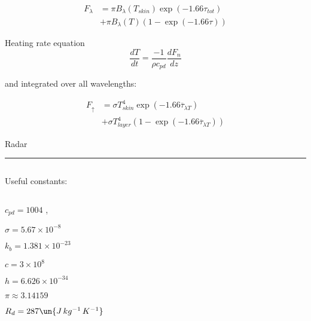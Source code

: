 \documentclass[12pt]{article}
\begin{document}
\begin{multicols}{2}
\begin{align}
  F_\lambda &= \pi B_\lambda(T_{skin}) \exp(-1.66 \tau_{tot}) \nonumber \\
  & +   \pi B_\lambda(T)(1 - \exp(-1.66 \tau))
\end{align}


\noindent
Heating rate equation
\begin{equation}
  \label{eq:fluxdiv}
  \frac{dT}{dt} = \frac{-1}{\rho c_{pd}} \frac{dF_n}{dz}
\end{equation}

\noindent
and integrated over all wavelengths:

     \begin{align}
       \label{eq:constantT}
       F_{\uparrow} &= \sigma T_{skin}^4 \exp( -1.66 \overline{\tau}_{\lambda T}  ) \nonumber \\
       & + \sigma T_{layer}^4(1- \exp( -1.66 \overline{\tau}_{\lambda T} ))
     \end{align}

\noindent
Radar


\rule{3cm}{.1mm}



$~$

\noindent
Useful constants:

$~$

$c_{pd}=1004$ , 

$\sigma=5.67 \times  10^{-8}$ 

$k_b = 1.381  \times 10^{-23}$  

$c=3 \times 10^{8}$ 

$h=6.626 \times 10^{-34}$ 

$\pi \approx 3.14159$

 $R_d=287 \un{J\,kg^{-1}\,K^{-1}}$


\end{multicols}
\end{document}

